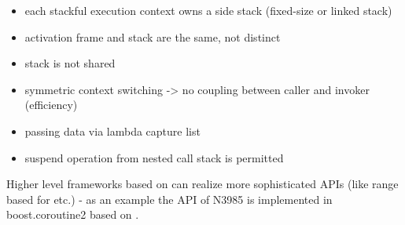 \begin{itemize}
    \item   each stackful execution context owns a side stack (fixed-size or
            linked stack)
    \item   activation frame and stack are the same, not distinct
    \item   stack is not shared
    \item   symmetric context switching -> no coupling between caller and
            invoker (efficiency)
    \item   passing data via lambda capture list
    \item   suspend operation from nested call stack is permitted
\end{itemize}
Higher level frameworks based on \ectx can realize more sophisticated APIs
(like range based for etc.) - as an example the API of N3985\cite{N3985} is
implemented in boost.coroutine2\cite{bcoroutine2} based on
.
